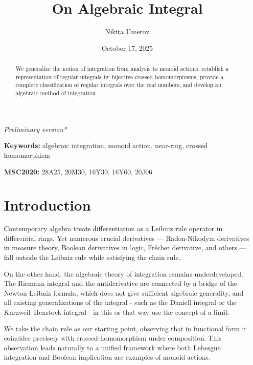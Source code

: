 \documentclass[12pt]{article}
\title{On Algebraic Integral}
\author{Nikita Umerov}
\date{October 17, 2025}
\theoremstyle{definition}
\begin{document}
\maketitle

{\centering
\noindent\textit{Preliminary version*}
\par}

\begin{abstract}
We generalize the notion of integration from analysis to monoid actions, 
establish a representation of regular integrals by bijective crossed-homomorphisms, 
provide a complete classification of regular integrals over the real numbers, 
and develop an algebraic method of integration.
\end{abstract}

\tableofcontents

\newpage
\noindent\textbf{Keywords:} algebraic integration, monoid action, near-ring, crossed homomorphism

\vspace{5pt}
\noindent\textbf{MSC2020:} 28A25, 20M30, 16Y30, 16Y60, 20J06

\section*{Introduction}

Contemporary algebra treats differentiation as a Leibniz rule operator in differential rings. 
Yet numerous crucial derivatives — Radon-Nikodym derivatives in measure theory, 
Boolean derivatives in logic, Fréchet derivative, and others — fall outside the Leibniz rule while satisfying the chain rule.

\vspace{5pt}

On the other hand, the algebraic theory of integration remains underdeveloped. 
The Riemann integral and the antiderivative are connected by a bridge of the Newton-Leibniz formula, 
which does not give sufficient algebraic generality, and all existing generalizations of the integral - 
such as the Daniell integral or the Kurzweil–Henstock integral - in this or that way use the concept of a limit.

\vspace{5pt}

We take the chain rule as our starting point, observing that in functional form it coincides precisely with crossed-homomorphism under composition. This observation leads naturally to a unified framework where both Lebesgue integration and Boolean implication are examples of monoid actions.
\end{document}
